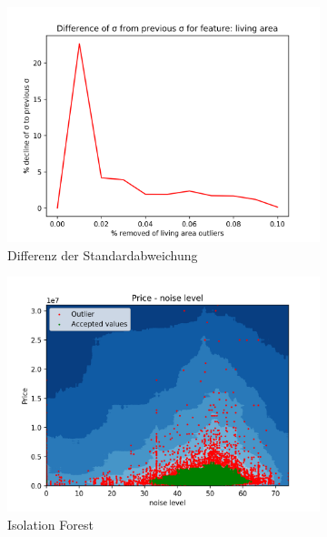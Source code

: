 \begin{figure}[h]
\begin{subfigure}{.5\textwidth}
  \centering
  \includegraphics[width=\linewidth]{images/anhang/outlier_detection/living_area_diff_of_std.png}
  \caption{Differenz der Standardabweichung} 
\end{subfigure}
\begin{subfigure}{.5\textwidth}
  \centering
  \includegraphics[width=\linewidth]{images/anhang/outlier_detection/noise_level_IsolationForest.png}
  \caption{Isolation Forest} 
\end{subfigure}
\begin{subfigure}{.5\textwidth}
\centering

\end{subfigure}
\end{figure}
